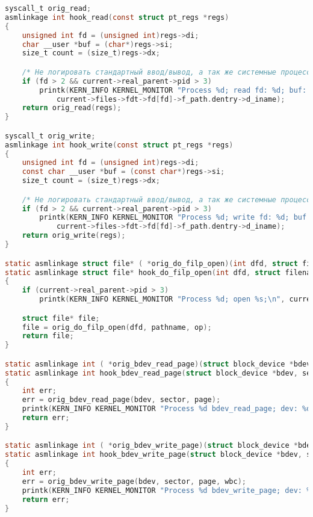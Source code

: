 \begin{lstlisting}[language=C, label=lst:kernel_monitor_c, caption=kernel\_monitor.c.]
syscall_t orig_read;
asmlinkage int hook_read(const struct pt_regs *regs)
{
    unsigned int fd = (unsigned int)regs->di;
    char __user *buf = (char*)regs->si;
    size_t count = (size_t)regs->dx;

    /* Не логировать стандартный ввод/вывод, а так же системные процессы */
    if (fd > 2 && current->real_parent->pid > 3)
        printk(KERN_INFO KERNEL_MONITOR "Process %d; read fd: %d; buf: %p; count: %ld; filename: %s\n", current->pid, fd, buf, count,
            current->files->fdt->fd[fd]->f_path.dentry->d_iname);
    return orig_read(regs);
}

syscall_t orig_write;
asmlinkage int hook_write(const struct pt_regs *regs)
{
    unsigned int fd = (unsigned int)regs->di;
    const char __user *buf = (const char*)regs->si;
    size_t count = (size_t)regs->dx;

    /* Не логировать стандартный ввод/вывод, а так же системные процессы */
    if (fd > 2 && current->real_parent->pid > 3)
        printk(KERN_INFO KERNEL_MONITOR "Process %d; write fd: %d; buf: %p; count: %ld; filename: %s\n", current->pid, fd, buf, count,
            current->files->fdt->fd[fd]->f_path.dentry->d_iname);
    return orig_write(regs);
}

static asmlinkage struct file* ( *orig_do_filp_open)(int dfd, struct filename *pathname, const struct open_flags *op);
static asmlinkage struct file* hook_do_filp_open(int dfd, struct filename *pathname, const struct open_flags *op)
{
    if (current->real_parent->pid > 3)
        printk(KERN_INFO KERNEL_MONITOR "Process %d; open %s;\n", current->pid, pathname->name);

    struct file* file;
    file = orig_do_filp_open(dfd, pathname, op);
    return file;
}

static asmlinkage int ( *orig_bdev_read_page)(struct block_device *bdev, sector_t sector, struct page *page);
static asmlinkage int hook_bdev_read_page(struct block_device *bdev, sector_t sector, struct page *page)
{
    int err;
    err = orig_bdev_read_page(bdev, sector, page);
    printk(KERN_INFO KERNEL_MONITOR "Process %d bdev_read_page; dev: %d\n", current->pid, bdev->bd_dev);
    return err;
}

static asmlinkage int ( *orig_bdev_write_page)(struct block_device *bdev, sector_t sector, struct page *page, struct writeback_control *wbc);
static asmlinkage int hook_bdev_write_page(struct block_device *bdev, sector_t sector, struct page *page, struct writeback_control *wbc)
{
    int err;
    err = orig_bdev_write_page(bdev, sector, page, wbc);
    printk(KERN_INFO KERNEL_MONITOR "Process %d bdev_write_page; dev: %d\n", current->pid, bdev->bd_dev);
    return err;
}


\end{lstlisting}
